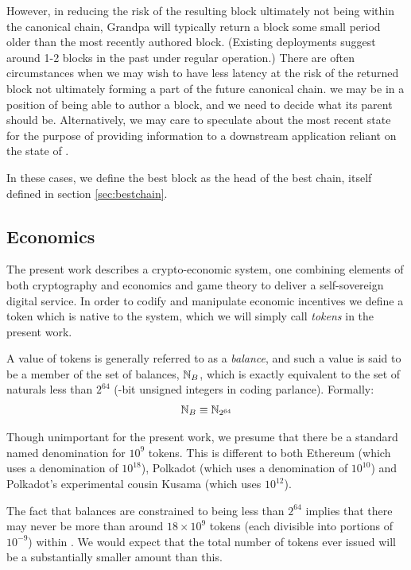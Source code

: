However, in reducing the risk of the resulting block ultimately not being within the canonical chain, Grandpa will typically return a block some small period older than the most recently authored block. (Existing deployments suggest around 1-2 blocks in the past under regular operation.) There are often circumstances when we may wish to have less latency at the risk of the returned block not ultimately forming a part of the future canonical chain. \Eg we may be in a position of being able to author a block, and we need to decide what its parent should be. Alternatively, we may care to speculate about the most recent state for the purpose of providing information to a downstream application reliant on the state of \Jam.

In these cases, we define the best block as the head of the best chain, itself defined in section \ref{sec:bestchain}.

\subsection{Economics}

The present work describes a crypto-economic system, \ie one combining elements of both cryptography and economics and game theory to deliver a self-sovereign digital service. In order to codify and manipulate economic incentives we define a token which is native to the system, which we will simply call \emph{tokens} in the present work.

A value of tokens is generally referred to as a \emph{balance}, and such a value is said to be a member of the set of balances, $\mathbb{N}_B$, which is exactly equivalent to the set of naturals less than $2^{64}$ (-bit unsigned integers in coding parlance). Formally:
\begin{align}\label{eq:balance}
  \mathbb{N}_B \equiv \mathbb{N}_{2^{64}}
\end{align}

Though unimportant for the present work, we presume that there be a standard named denomination for $10^{9}$ tokens. This is different to both Ethereum (which uses a denomination of $10^{18}$), Polkadot (which uses a denomination of $10^{10}$) and Polkadot's experimental cousin Kusama (which uses $10^{12}$).

The fact that balances are constrained to being less than $2^{64}$ implies that there may never be more than around $18\times10^{9}$ tokens (each divisible into portions of $10^{-9}$) within \Jam. We would expect that the total number of tokens ever issued will be a substantially smaller amount than this.

